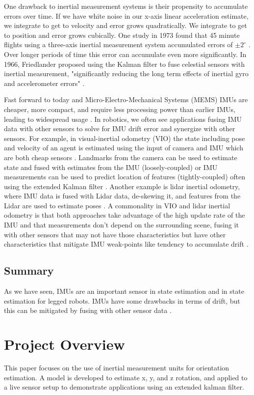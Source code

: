 \documentclass[conference]{IEEEtran}
\begin{document}
One drawback to inertial measurement systems is their propensity to accumulate errors over time. If we have white noise in our x-axis linear acceleration estimate, we integrate to get to velocity and error grows quadratically. We integrate to get to position and error grows cubically. One study in 1973 found that 45 minute flights using a three-axis inertial measurement system accumulated errors of $\pm 2^{\circ}$ \cite{b4}. Over longer periods of time this error can accumulate even more significantly. In 1966, Friedlander proposed using the Kalman filter to fuse celestial sensors with inertial measurement, "significantly reducing the long term effects of inertial gyro and accelerometer errors" \cite{b5}.

Fast forward to today and Micro-Electro-Mechanical Systems (MEMS) IMUs are cheaper, more compact, and require less processing power than earlier IMUs, leading to widespread usage \cite{b6}. In robotics, we often see applications fusing IMU data with other sensors to solve for IMU drift error and synergize with other sensors. For example, in visual-inertial odometry (VIO) the state including pose and velocity of an agent is estimated using the input of camera and IMU which are both cheap sensors \cite{b7}. Landmarks from the camera can be used to estimate state and fused with estimates from the IMU (loosely-coupled) or IMU measurements can be used to predict location of features (tightly-coupled) often using the extended Kalman filter \cite{b7}. Another example is lidar inertial odometry, where IMU data is fused with Lidar data, de-skewing it, and features from the Lidar are used to estimate poses \cite{b8}. A commonality in VIO and lidar inertial odometry is that both approaches take advantage of the high update rate of the IMU and that measurements don't depend on the surrounding scene, fusing it with other sensors that may not have those characteristics but have other characteristics that mitigate IMU weak-points like tendency to accumulate drift \cite{b7} \cite{b8}.

\subsection{Summary}
As we have seen, IMUs are an important sensor in state estimation and in state estimation for legged robots. IMUs have some drawbacks in terms of drift, but this can be mitigated by fusing with other sensor data \cite{b5} \cite{b7} \cite{b12}.

\section{Project Overview}
This paper focuses on the use of inertial measurement units for orientation estimation. A model is developed to estimate x, y, and z rotation, and applied to a live sensor setup to demonstrate applications using an extended kalman filter.
\end{document}
